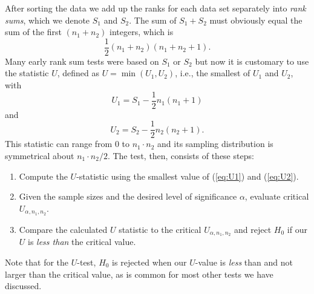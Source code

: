 	After sorting the data we add up the ranks for each data set separately into \emph{rank sums}, which we 
denote $S_1$ and $S_2$.  The sum of $S_1 + S_2$ must obviously equal the sum of the first 
$(n_1 + n_2)$ integers, which is
\begin{equation}
\frac{1}{2} (n_1 + n_2) (n_1 + n_2 + 1 ).
\end{equation}
Many early rank sum tests were based on $S_1$ or $S_2$ but now it is customary to use the statistic $U$,
defined as $U = \min {(U_1,U_2)}$, i.e., the smallest of $U_1$ and $U_2$, with
\begin{equation}
U_1 = S_1 - \frac{1}{2} n_1 (n_1 + 1)
\label{eq:U1}
\end{equation}
and
\begin{equation}
U_2 = S_2 - \frac{1}{2} n_2 (n_2 + 1).
\label{eq:U2}
\end{equation}	 	
This statistic can range from 0 to $n_1\cdot n_2$ and its 
sampling distribution is symmetrical about $n_1 \cdot n_2/2$.  The test, then, consists of these steps:
\begin{enumerate}
	\item Compute the $U$-statistic using the smallest value of (\ref{eq:U1}) and (\ref{eq:U2}).
	\item Given the sample sizes and the desired level of significance 
		$\alpha$, evaluate critical $U_{\alpha,n_1,n_2}$.
	\item Compare the calculated $U$ statistic to the critical $U_{\alpha,n_1,n_2}$ and
		reject $H_0$ if our $U$ is \emph{less than} the critical value.
\end{enumerate}
Note that for the $U$-test, $H_0$ is rejected when our $U$-value is \emph{less} than and not larger than
the critical value, as is common for most other tests we have discussed.

